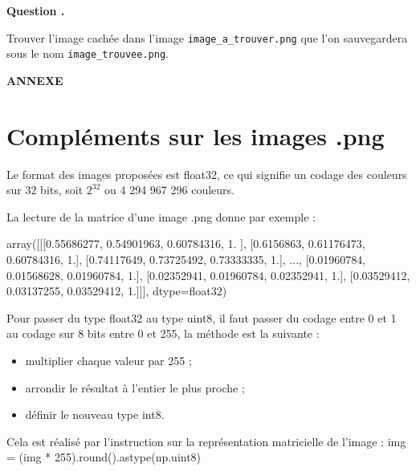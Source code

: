 \documentclass[10pt]{article}
\newcounter{cexo}
\newenvironment{qexo}{
\refstepcounter{cexo}
\vspace{3 pt}
\noindent
\begin{minipage}[t]{0.15\textwidth}
\textbf{\noindent Question \arabic{cexo}. }
\end{minipage}\noindent
\begin{minipage}[t]{0.85\textwidth}}{\vspace{3 pt}
\end{minipage}}%
\begin{document}
\begin{qexo}
Trouver l’image cachée dans l’image \texttt{image\_a\_trouver.png} que l’on sauvegardera sous le nom \texttt{image\_trouvee.png}.
\end{qexo}



\newpage
\begin{center}
\vspace{1cm}\textbf{\Large ANNEXE}
\end{center}

\section*{Compléments sur les images .png}


Le format des images proposées est float32, ce qui signifie un codage des couleurs sur 32 bits, soit $2^{32}$ ou 4 294 967 296 couleurs.

La lecture de la matrice d’une image .png donne par exemple :
\begin{python}
array([[[0.55686277, 0.54901963, 0.60784316, 1. ],
[0.6156863, 0.61176473, 0.60784316, 1.],
[0.74117649, 0.73725492, 0.73333335, 1.],
..., 
[0.01960784, 0.01568628, 0.01960784, 1.],
[0.02352941, 0.01960784, 0.02352941, 1.],
[0.03529412, 0.03137255, 0.03529412, 1.]]], dtype=float32)
\end{python}

Pour passer du type float32 au type uint8, il faut passer du codage entre 0 et 1 au codage sur 8 bits entre 0 et 255, la méthode est la suivante :
\begin{itemize}
\item multiplier chaque valeur par 255 ;
\item arrondir le résultat à l’entier le plus proche ;
\item définir le nouveau type int8.
\end{itemize}


Cela est réalisé par l'instruction sur la représentation matricielle de l'image :
img = (img * 255).round().astype(np.uint8)





































\end{document}
